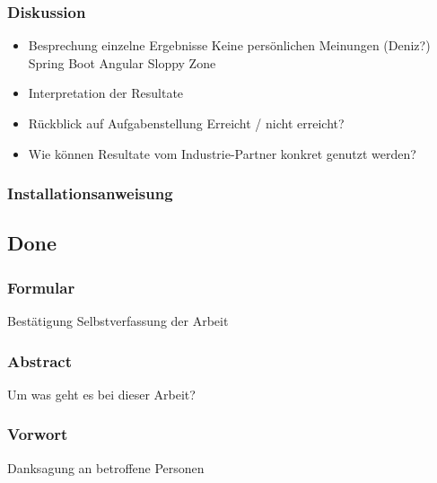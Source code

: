 \documentclass[../main.tex]{subfiles}
\begin{document}
	\subsubsection{Diskussion}
	\begin{itemize}
		\item Besprechung einzelne Ergebnisse
		\subitem Keine persönlichen Meinungen (Deniz?)
		\subitem Spring Boot
		\subitem Angular
		\subitem Sloppy Zone
		
		\item Interpretation der Resultate
		
		\item Rückblick auf Aufgabenstellung
		\subitem Erreicht / nicht erreicht?
		
		\item Wie können Resultate vom Industrie-Partner konkret genutzt werden?
	\end{itemize}
	
	\subsubsection{Installationsanweisung}
	\subsection{Done}

	\subsubsection{Formular}
	Bestätigung Selbstverfassung der Arbeit %

	\subsubsection{Abstract}
	Um was geht es bei dieser Arbeit? %

	\subsubsection{Vorwort}
	Danksagung an betroffene Personen
	
\end{document}
